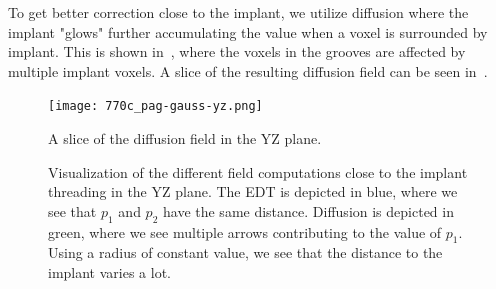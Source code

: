 To get better correction close to the implant, we utilize diffusion where the implant "glows" further
accumulating the value when a voxel is surrounded by implant. This is shown in~,
where the voxels in the grooves are affected by multiple implant voxels. A slice of the resulting
diffusion field can be seen in~.

\begin{figure}
    \texttt{[image: 770c\_pag-gauss-yz.png]}
    \caption{A slice of the diffusion field in the YZ plane.}
    \label{fig:field-slice}
\end{figure}

\begin{figure}
    \vspace{-1.5cm}
    \centering
      \vspace{-3.5cm}
    \caption{Visualization of the different field computations close to the implant threading in the YZ plane. The EDT is depicted in blue, where we see that $p_1$ and $p_2$ have the same distance. Diffusion is depicted in green, where we see multiple arrows contributing to the value of $p_1$. Using a radius of constant value, we see that the distance to the implant varies a lot.}
    \label{fig:edt-vs-diffusion}
\end{figure}

